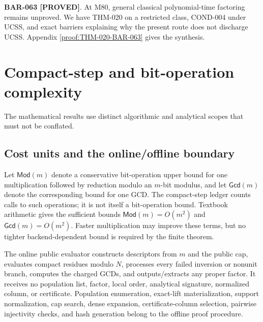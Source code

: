 \documentclass[11pt]{article}
\newcommand{\claimstatus}[2]{\textbf{#1 [#2]}}
\begin{document}
\claimstatus{BAR-063}{PROVED}. At M80, general classical polynomial-time
factoring remains unproved. We have THM-020 on a restricted class, COND-004
under UCSS, and exact barriers explaining why the present route does not
discharge UCSS. Appendix \ref{proof:THM-020-BAR-063} gives the synthesis.

\section{Compact-step and bit-operation complexity}

The mathematical results use distinct algorithmic and analytical scopes that
must not
be conflated.

\subsection{Cost units and the online/offline boundary}

Let \(\mathsf{Mod}(m)\) denote a conservative bit-operation upper bound for
one multiplication followed by reduction modulo an \(m\)-bit modulus, and
let \(\mathsf{Gcd}(m)\) denote the corresponding bound for one GCD. The
compact-step ledger counts calls to such operations; it is not itself a
bit-operation bound. Textbook arithmetic gives the sufficient bounds
\(\mathsf{Mod}(m)=O(m^2)\) and
\(\mathsf{Gcd}(m)=O(m^2)\). Faster multiplication may improve these terms,
but no tighter backend-dependent bound is required by the finite theorem.

The online public evaluator constructs descriptors from \(m\) and the public
cap, evaluates compact residues modulo \(N\), processes every failed
inversion or nonunit branch, computes the charged GCDs, and outputs/extracts
any proper factor. It receives no population list, factor, local order,
analytical signature, normalized column, or certificate. Population
enumeration, exact-lift materialization, support normalization, cap search,
dense expansion, certificate-column selection, pairwise injectivity checks,
and hash generation belong to the offline proof procedure.
\end{document}
